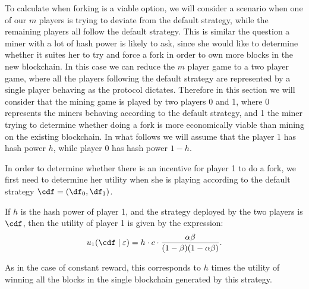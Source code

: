 To calculate when forking is a viable option, we will consider a scenario when one of our $m$ players is trying to deviate from the default strategy, while the remaining players all follow the default strategy. This is similar the question a miner with a lot of hash power is likely to ask, since she would like to determine whether it suites her to try and force a fork in order to own more blocks in the new blockchain. In this case we can reduce the $m$ player game to a two player game, where all the players following the default strategy are represented by a single player behaving as the protocol dictates. Therefore  in this section we will consider that the mining game is played by two players 0 and 1, where 0 represents the miners behaving according to the default strategy, and 1 the miner trying to determine whether doing a fork is more economically viable than mining on the existing blockchain. In what follows we will assume that the player 1 has hash power $h$, while player 0 has hash power $1-h$.

In order to determine whether there is an incentive for player 1 to do a fork, we first need to determine her utility when she is playing according to the default strategy $\cdf = (\df_0,\df_1)$. 

\begin{lemma}\label{lem:default_utility}
If $h$ is the hash power of player 1, and the strategy deployed by the two players is $\cdf$, then the utility of player 1 is given by the expression:
$$u_1(\cdf\mid\varepsilon) = h\cdot c\cdot\frac{\alpha\beta}{(1-\beta)(1-\alpha\beta)}.$$
\end{lemma}

As in the case of constant reward, this corresponds to $h$ times the utility of winning all the blocks in the single blockchain generated by this strategy.



